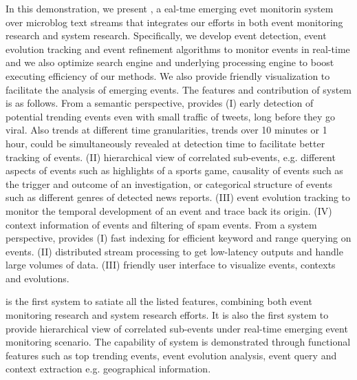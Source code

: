 In this demonstration, we present \ring, a eal-tme emerging evet monitorin system over microblog text streams that integrates our efforts in both event monitoring research and system research.
Specifically, we develop event detection, event evolution tracking and event refinement algorithms to monitor events in real-time and we also optimize search engine and underlying processing engine to boost executing efficiency of our methods. We also provide friendly visualization to facilitate the analysis of emerging events.
The features and contribution of \ring system is as follows.
From a semantic perspective, \ring provides
(I)   early detection of potential trending events even with small traffic of tweets, long before they go viral. Also trends at different time granularities, \ie trends over 10 minutes or 1 hour, could be simultaneously revealed at detection time to facilitate better tracking of events.
(II)  hierarchical view of correlated sub-events, e.g. different aspects of events such as highlights of a sports game, causality of events such as the trigger and outcome of an investigation, or categorical structure of events such as different genres of detected news reports.
(III) event evolution tracking to monitor the temporal development of an event and trace back its origin.
(IV)  context information of events and filtering of spam events.
From a system perspective, \ring provides
(I)   fast indexing for efficient keyword and range querying on events.
(II)  distributed stream processing to get low-latency outputs and handle large volumes of data.
(III) friendly user interface to visualize events, contexts and evolutions.

\ring is the first system to satiate all the listed features, combining both event monitoring research and system research efforts.
It is also the first system to provide hierarchical view of correlated sub-events under real-time emerging event monitoring scenario.
The capability of \ring system is demonstrated through functional features such as top trending events, event evolution analysis, event query and context extraction e.g. geographical information.


